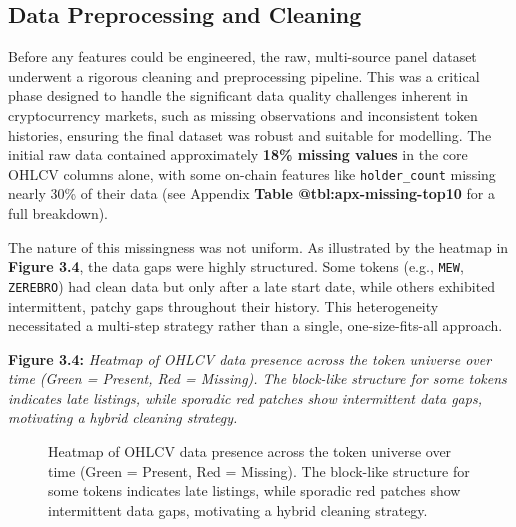 \documentclass[
  a4paper,
  DIV=11,
  numbers=noendperiod]{scrreprt}
\begin{document}
\subsection{Data Preprocessing and
Cleaning}\label{data-preprocessing-and-cleaning}

Before any features could be engineered, the raw, multi-source panel
dataset underwent a rigorous cleaning and preprocessing pipeline. This
was a critical phase designed to handle the significant data quality
challenges inherent in cryptocurrency markets, such as missing
observations and inconsistent token histories, ensuring the final
dataset was robust and suitable for modelling. The initial raw data
contained approximately \textbf{18\% missing values} in the core OHLCV
columns alone, with some on-chain features like \texttt{holder\_count}
missing nearly 30\% of their data (see Appendix \textbf{Table
@tbl:apx-missing-top10} for a full breakdown).

The nature of this missingness was not uniform. As illustrated by the
heatmap in \textbf{Figure 3.4}, the data gaps were highly structured.
Some tokens (e.g., \texttt{MEW}, \texttt{ZEREBRO}) had clean data but
only after a late start date, while others exhibited intermittent,
patchy gaps throughout their history. This heterogeneity necessitated a
multi-step strategy rather than a single, one-size-fits-all approach.

\textbf{Figure 3.4:} \emph{Heatmap of OHLCV data presence across the
token universe over time (Green = Present, Red = Missing). The
block-like structure for some tokens indicates late listings, while
sporadic red patches show intermittent data gaps, motivating a hybrid
cleaning strategy.}

\begin{figure}


\caption{\label{fig-ohlcv-heat}Heatmap of OHLCV data presence across the
token universe over time (Green = Present, Red = Missing). The
block-like structure for some tokens indicates late listings, while
sporadic red patches show intermittent data gaps, motivating a hybrid
cleaning strategy.}

\end{figure}%
\end{document}
